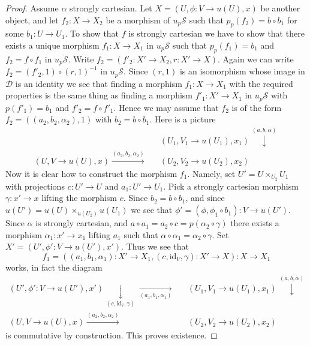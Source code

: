 \begin{proof}
\medskip\noindent
Assume $\alpha$ strongly cartesian.
Let $X = (U, \phi : V \to u(U), x)$ be another object, and let
$f_2 : X \to X_2$ be a morphism of $u_p\mathcal{S}$
such that $p_p(f_2) = b \circ b_1$ for some $b_1 : U \to U_1$.
To show that $f$ is strongly cartesian we have to show
that there exists a unique morphism $f_1 : X \to X_1$ in $u_p\mathcal{S}$
such that $p_p(f_1) = b_1$ and $f_2 = f \circ f_1$ in $u_p\mathcal{S}$.
Write $f_2 = (f'_2 : X' \to X_2, r : X' \to X)$. Again we can write
$f_2 = (f'_2, 1) \circ (r, 1)^{-1}$ in $u_p\mathcal{S}$. Since $(r, 1)$
is an isomorphism whose image in $\mathcal{D}$ is an identity we
see that finding a morphism $f_1 : X \to X_1$ with the required
properties is the same thing as finding a morphism $f'_1 : X' \to X_1$
in $u_p\mathcal{S}$ with $p(f'_1) = b_1$ and $f'_2 = f \circ f'_1$.
Hence we may assume that $f_2$ is of the form
$f_2 = ((a_2, b_2, \alpha_2), 1)$ with $b_2 = b \circ b_1$. Here is
a picture
$$
\begin{array}{ccc} &  & (U_1, V_1 \to u(U_1), x_1) \overset{(a, b, \alpha)}{\downarrow} \\ (U, V \to u(U), x) \overset{(a_2, b_2, \alpha_2)}{\longrightarrow} &  & (U_2, V_2 \to u(U_2), x_2)\end{array}
$$
Now it is clear how to construct the morphism $f_1$.
Namely, set $U' = U \times_{U_2} U_1$ with projections
$c : U' \to U$ and $a_1 : U' \to U_1$.
Pick a strongly cartesian morphism $\gamma : x' \to x$
lifting the morphism $c$. Since $b_2 = b \circ b_1$,
and since $u(U') = u(U) \times_{u(U_2)} u(U_1)$ we see that
$\phi' = (\phi, \phi_1 \circ b_1) : V \to u(U')$. Since
$\alpha$ is strongly cartesian, and
$a \circ a_1 = a_2 \circ c = p(\alpha_2 \circ \gamma)$
there exists a morphism
$\alpha_1 : x' \to x_1$ lifting $a_1$ such that
$\alpha \circ \alpha_1 = \alpha_2 \circ \gamma$.
Set $X' = (U', \phi' : V \to u(U'), x')$.
Thus we see that
$$
f_1 =
((a_1, b_1, \alpha_1) : X' \to X_1, (c, \text{id}_V, \gamma) : X' \to X) :
X \longrightarrow X_1
$$
works, in fact the diagram
$$
\begin{array}{ccc}(U', \phi' : V \to u(U'), x')
\underset{(c, \text{id}_V, \gamma)}{\downarrow}\underset{(a_1, b_1, \alpha_1)}{\longrightarrow} &  & (U_1, V_1 \to u(U_1), x_1) \overset{(a, b, \alpha)}{\downarrow} \\ (U, V \to u(U), x) \overset{(a_2, b_2, \alpha_2)}{\longrightarrow} &  & (U_2, V_2 \to u(U_2), x_2)\end{array}
$$
is commutative by construction. This proves existence.


\end{proof}

